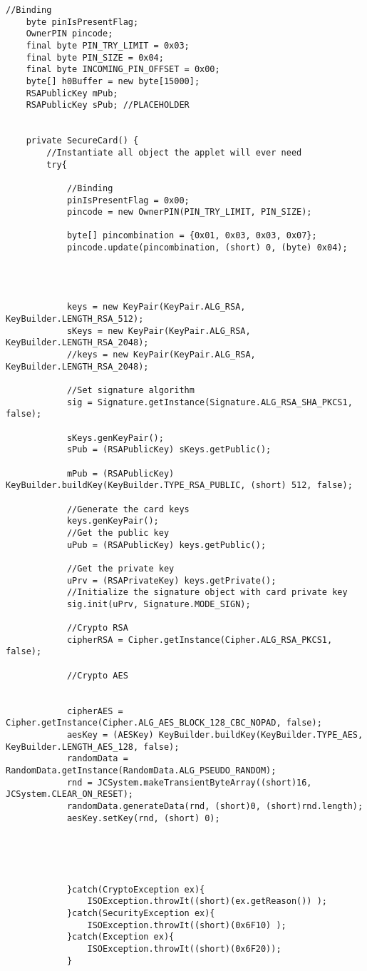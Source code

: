 \begin{lstlisting}[caption=SecureCard.java.,breaklines=true,breakatwhitespace=false, label=lst:SecureCard,escapechar=!]
	//Binding
	byte pinIsPresentFlag;
	OwnerPIN pincode;
	final byte PIN_TRY_LIMIT = 0x03;
	final byte PIN_SIZE = 0x04;
	final byte INCOMING_PIN_OFFSET = 0x00;
	byte[] h0Buffer = new byte[15000];
	RSAPublicKey mPub;
	RSAPublicKey sPub; //PLACEHOLDER


	private SecureCard() {
		//Instantiate all object the applet will ever need
		try{

			//Binding
			pinIsPresentFlag = 0x00;
			pincode = new OwnerPIN(PIN_TRY_LIMIT, PIN_SIZE);

			byte[] pincombination = {0x01, 0x03, 0x03, 0x07};
			pincode.update(pincombination, (short) 0, (byte) 0x04);




			keys = new KeyPair(KeyPair.ALG_RSA, KeyBuilder.LENGTH_RSA_512);
			sKeys = new KeyPair(KeyPair.ALG_RSA, KeyBuilder.LENGTH_RSA_2048);
			//keys = new KeyPair(KeyPair.ALG_RSA, KeyBuilder.LENGTH_RSA_2048);

			//Set signature algorithm
			sig = Signature.getInstance(Signature.ALG_RSA_SHA_PKCS1, false);

			sKeys.genKeyPair();
			sPub = (RSAPublicKey) sKeys.getPublic();

			mPub = (RSAPublicKey) KeyBuilder.buildKey(KeyBuilder.TYPE_RSA_PUBLIC, (short) 512, false);

			//Generate the card keys
			keys.genKeyPair();
			//Get the public key
			uPub = (RSAPublicKey) keys.getPublic();

			//Get the private key
			uPrv = (RSAPrivateKey) keys.getPrivate();
			//Initialize the signature object with card private key
			sig.init(uPrv, Signature.MODE_SIGN);

			//Crypto RSA
			cipherRSA = Cipher.getInstance(Cipher.ALG_RSA_PKCS1, false);

			//Crypto AES


			cipherAES = Cipher.getInstance(Cipher.ALG_AES_BLOCK_128_CBC_NOPAD, false);
			aesKey = (AESKey) KeyBuilder.buildKey(KeyBuilder.TYPE_AES, KeyBuilder.LENGTH_AES_128, false);
			randomData = RandomData.getInstance(RandomData.ALG_PSEUDO_RANDOM);
			rnd = JCSystem.makeTransientByteArray((short)16, JCSystem.CLEAR_ON_RESET);
			randomData.generateData(rnd, (short)0, (short)rnd.length);
			aesKey.setKey(rnd, (short) 0);





			}catch(CryptoException ex){
				ISOException.throwIt((short)(ex.getReason()) );
			}catch(SecurityException ex){
				ISOException.throwIt((short)(0x6F10) );
			}catch(Exception ex){
				ISOException.throwIt((short)(0x6F20));
			}




\end{lstlisting}
